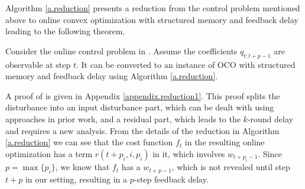 Algorithm \ref{a.reduction} presents a reduction from the control problem mentioned above to online convex optimization with structured memory and feedback delay leading to the following theorem. 

\begin{theorem}\label{t.reduction}
Consider the online control problem in . Assume the coefficients $q_{t:t+p-1}$ are observable at step $t$. It can be converted to an instance of OCO with structured memory and feedback delay using Algorithm \ref{a.reduction}. 
\end{theorem} 

A proof of  is given in Appendix \ref{appendix.reduction1}. This proof splits the disturbance into an input disturbance part, which can be dealt with using approaches in prior work, and a residual part, which leads to the $k$-round delay and requires a new analysis. From the details of the reduction in Algorithm \ref{a.reduction}  we can see that the cost function $f_t$ in the resulting online optimization has a term $r(t+p_i,i,p_i)$ in it, which involves $w_{t+p_i-1}$. Since $p=\max\{p_i\}$, we know that $f_t$ has a $w_{t+p-1}$, which is not revealed until step $t+p$ in our setting, resulting in a $p$-step feedback delay.

\iffalse
\begin{algorithm}[t!]
   \caption{Reduction to OCO with Memory and Delay}
   \label{a.reduction}
\begin{algorithmic}[1]
   \STATE {\bfseries Input:} Transition matrix $A$ and control matrix $B$
   \STATE {\bfseries Solver:} OCO with memory $p$ and delay $p$ algorithm ALG
   \FOR{$t=0$ to $T-1$}
        \STATE {\bfseries Observe:} $x_t$ and $q_{t:t+p-1}$
        \IF{$t>0$}
            \STATE $w_{t-1}\leftarrow x_t-Ax_{t-1}-Bu_{t-1}$
            \STATE $\zeta_{t-1}\leftarrow\psi(w_{t-1})+\sum_{i=1}^pC_i\zeta_{t-1-i}$
        \ENDIF
        \STATE $f_t(y):=\frac{1}{2}\sum\limits_{i=1}^d\sum\limits_{j=1}^{p_i}q_{t+j}\left(y^{(i)}+\zeta_t^{(i)}+r(t+j,i,j)\right)^2$
        \STATE $h_t(y):=\frac{1}{2}\sum\limits_{i=1}^d\sum\limits_{j=1}^{p_i}q_{t+j}\left(y^{(i)}\right)^2$
        \STATE Work out $v_{t-p}\leftarrow\arg\min_vf_{t-p}(y)$
        \STATE Feed $v_{t-p}$ and $h_t$ into ALG
        \STATE Obtain the output of ALG, $y_t$
        \STATE $u_t\leftarrow y_t-\sum_{i=1}^pC_iy_{t-i}$
   \ENDFOR
\end{algorithmic}
\end{algorithm}
\fi

